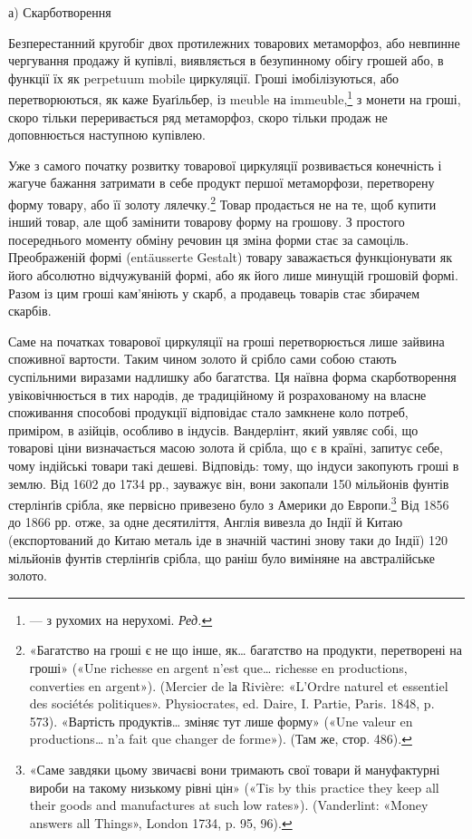 а) Скарботворення

Безперестанний кругобіг двох протилежних товарових метаморфоз,
або невпинне чергування продажу й купівлі, виявляється
в безупинному обігу грошей або, в функції їх як perpetuum mobile
циркуляції. Гроші імобілізуються, або перетворюються, як
каже Буаґільбер, із meuble на immeuble,\footnote*{
— з рухомих на нерухомі. \emph{Ред.}
} з монети на гроші,
скоро тільки переривається ряд метаморфоз, скоро тільки продаж
не доповнюється наступною купівлею.

Уже з самого початку розвитку товарової циркуляції розвивається
конечність і жагуче бажання затримати в себе продукт
першої метаморфози, перетворену форму товару, або її золоту
лялечку.\footnote{
«Багатство на гроші є не що інше, як\dots{} багатство на продукти,
перетворені на гроші» («Une richesse en argent n’est que\dots{} richesse en
productions, converties en argent»). (Mercier de lа Rivière: «L’Ordre naturel
et essentiel des sociétés politiques». Physiocrates, ed. Daire, I. Partie, Paris.
1848, p. 573). «Вартість продуктів\dots{} зміняє тут лише форму» («Une valeur
en productions\dots{} n’a fait que changer de forme»). (Там же, стор. 486).
} Товар продається не на те, щоб купити інший товар,
але щоб замінити товарову форму на грошову. З простого посереднього
моменту обміну речовин ця зміна форми стає за самоціль.
Преображеній формі (entäusserte Gestalt) товару заважається
функціонувати як його абсолютно відчужуваній формі,
або як його лише минущій грошовій формі. Разом із цим гроші
кам’яніють у скарб, а продавець товарів стає збирачем скарбів.

Саме на початках товарової циркуляції на гроші перетворюється
лише зайвина споживної вартости. Таким чином золото
й срібло сами собою стають суспільними виразами надлишку або
багатства. Ця наївна форма скарботворення увіковічнюється в
тих народів, де традиційному й розрахованому на власне споживання
способові продукції відповідає стало замкнене коло потреб,
приміром, в азійців, особливо в індусів. Вандерлінт, який уявляє
собі, що товарові ціни визначається масою золота й срібла, що
є в країні, запитує себе, чому індійські товари такі дешеві.
Відповідь: тому, що індуси закопують гроші в землю. Від 1602
до 1734 рр., зауважує він, вони закопали 150 мільйонів фунтів
стерлінґів срібла, яке первісно привезено було з Америки до
Европи.\footnote{
«Саме завдяки цьому звичаєві вони тримають свої товари й мануфактурні
вироби на такому низькому рівні цін» («Tis by this practice
they keep all their goods and manufactures at such low rates»). (Vanderlint:
«Money answers all Things», London 1734, p. 95, 96).
} Від 1856 до 1866 рр. отже, за одне десятиліття, Англія
вивезла до Індії й Китаю (експортований до Китаю металь іде в
значній частині знову таки до Індії) 120 мільйонів фунтів стерлінґів
срібла, що раніш було виміняне на австралійське золото.

